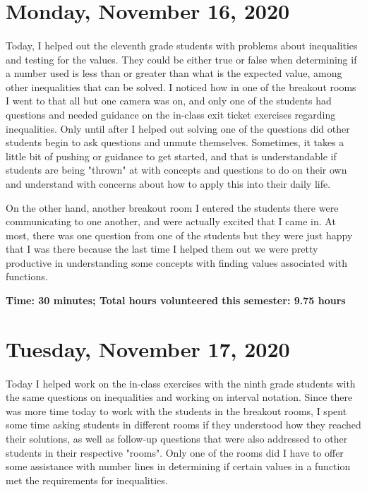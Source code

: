 \documentclass{article}
\begin{document}
\section{Monday, November 16, 2020}

\paragraph{}Today, I helped out the eleventh grade students with problems about inequalities and testing for the values. They could be either true or false when determining if a number used is less than or greater than what is the expected value, among other inequalities that can be solved. I noticed how in one of the breakout rooms I went to that all but one camera was on, and only one of the students had questions and needed guidance on the in-class exit ticket exercises regarding inequalities. Only until after I helped out solving one of the questions did other students begin to ask questions and unmute themselves. Sometimes, it takes a little bit of pushing or guidance to get started, and that is understandable if students are being "thrown" at with concepts and questions to do on their own and understand with concerns about how to apply this into their daily life. 

On the other hand, another breakout room I entered the students there were communicating to one another, and were actually excited that I came in. At most, there was one question from one of the students but they were just happy that I was there because the last time I helped them out we were pretty productive in understanding some concepts with finding values associated with functions. 

\textbf{Time: 30 minutes; Total hours volunteered this semester: 9.75 hours}


\section{Tuesday, November 17, 2020}

\paragraph{}Today I helped work on the in-class exercises with the ninth grade students with the same questions on inequalities and working on interval notation. Since there was more time today to work with the students in the breakout rooms, I spent some time asking students in different rooms if they understood how they reached their solutions, as well as follow-up questions that were also addressed to other students in their respective "rooms". Only one of the rooms did I have to offer some assistance with number lines in determining if certain values in a function met the requirements for inequalities. 
\end{document}
